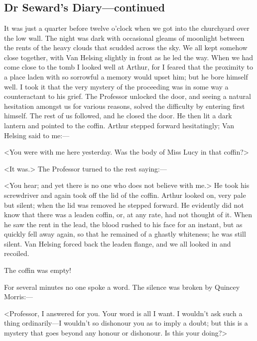 \chapter[Chapter \thechapter]{}

\section{Dr Seward's Diary—continued}

It was just a quarter before twelve o'clock when we got into the churchyard over the low wall. The night was dark with occasional gleams of moonlight between the rents of the heavy clouds that scudded across the sky. We all kept somehow close together, with Van Helsing slightly in front as he led the way. When we had come close to the tomb I looked well at Arthur, for I feared that the proximity to a place laden with so sorrowful a memory would upset him; but he bore himself well. I took it that the very mystery of the proceeding was in some way a counteractant to his grief. The Professor unlocked the door, and seeing a natural hesitation amongst us for various reasons, solved the difficulty by entering first himself. The rest of us followed, and he closed the door. He then lit a dark lantern and pointed to the coffin. Arthur stepped forward hesitatingly; Van Helsing said to me:—

<You were with me here yesterday. Was the body of Miss Lucy in that coffin?>

<It was.> The Professor turned to the rest saying:—

<You hear; and yet there is no one who does not believe with me.> He took his screwdriver and again took off the lid of the coffin. Arthur looked on, very pale but silent; when the lid was removed he stepped forward. He evidently did not know that there was a leaden coffin, or, at any rate, had not thought of it. When he saw the rent in the lead, the blood rushed to his face for an instant, but as quickly fell away again, so that he remained of a ghastly whiteness; he was still silent. Van Helsing forced back the leaden flange, and we all looked in and recoiled.

The coffin was empty!

For several minutes no one spoke a word. The silence was broken by Quincey Morris:—

<Professor, I answered for you. Your word is all I want. I wouldn't ask such a thing ordinarily—I wouldn't so dishonour you as to imply a doubt; but this is a mystery that goes beyond any honour or dishonour. Is this your doing?>

